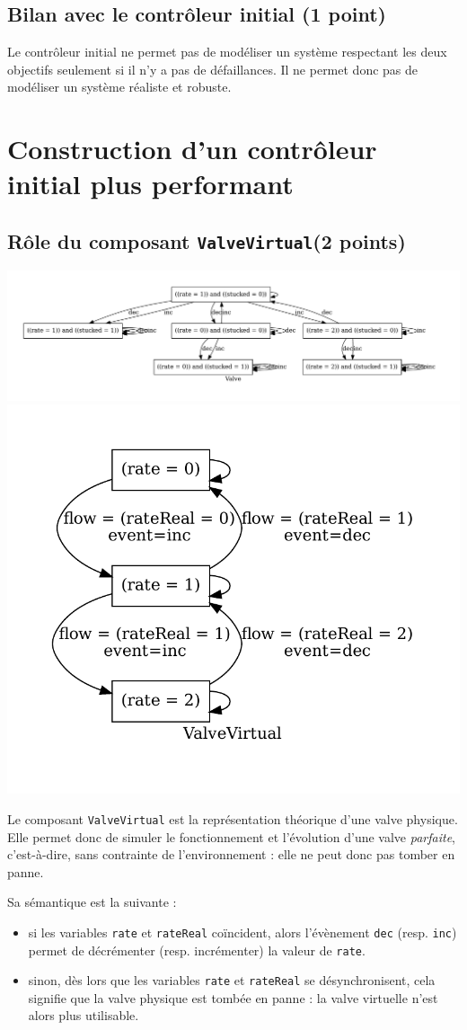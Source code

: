 \documentclass[a4paper]{book}
\begin{document}
\subsection{Bilan avec le contrôleur initial (1 point)}

Le contrôleur initial ne permet pas de modéliser un système respectant les deux
objectifs seulement si il n'y a pas de défaillances. Il ne permet donc pas de
modéliser un système réaliste et robuste.

\section{Construction d'un contrôleur initial plus performant}
\subsection{Rôle du composant {\tt ValveVirtual}(2 points)}
\includegraphics[height=.2\textheight,width=.5\textwidth]{Graphs/Valve-modes.pdf}
\includegraphics[height=.2\textheight,width=.5\textwidth]{Graphs/ValveVirtual-modes.pdf}

Le composant \texttt{ValveVirtual} est la représentation théorique d'une valve
physique. Elle permet donc de simuler le fonctionnement et l'évolution d'une
valve \textit{parfaite}, c'est-à-dire, sans contrainte de l'environnement :
elle ne peut donc pas tomber en panne.

Sa sémantique est la suivante :
\begin{itemize}
  \item si les variables \texttt{rate} et \texttt{rateReal} coïncident, alors
    l'évènement \texttt{dec} (resp. \texttt{inc}) permet de décrémenter (resp.
    incrémenter) la valeur de \texttt{rate}.
  \item sinon, dès lors que les variables \texttt{rate} et \texttt{rateReal} se
    désynchronisent, cela signifie que la valve physique est tombée en panne :
    la valve virtuelle n'est alors plus utilisable.
\end{itemize}
\end{document}

